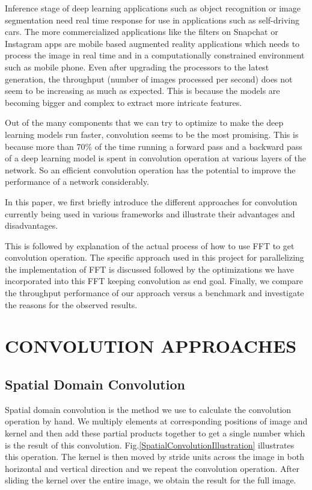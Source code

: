 \documentclass[sigconf]{acmart}
\begin{document}
Inference stage of deep learning applications such as object recognition or image segmentation need real time response for use in applications such as self-driving cars. The more commercialized applications like the filters on Snapchat or Instagram apps are mobile based augmented reality applications which needs to process the image in real time and in a computationally constrained environment such as mobile phone. Even after upgrading the processors to the latest generation, the throughput (number of images processed per second) does not seem to be increasing as much as expected. This is because the models are becoming bigger and complex to extract more intricate features.

Out of the many components that we can try to optimize to make the deep learning models run faster, convolution seems to be the most promising. This is because more than 70\% of the time  running a forward pass and a backward pass of a deep learning model is spent in convolution operation at various layers of the network. So an efficient convolution operation has the potential to improve the performance of a network considerably.

In this paper, we first briefly introduce the different approaches for convolution currently being used in various frameworks and illustrate their advantages and disadvantages.

This is followed by explanation of the actual process of how to use FFT to get convolution operation. The specific approach used in this project for parallelizing the implementation of FFT is discussed followed by the optimizations we have incorporated into this FFT keeping convolution as end goal. Finally, we compare the throughput performance of our approach versus a benchmark and investigate the reasons for the observed results.

\section{CONVOLUTION APPROACHES}
\subsection{Spatial Domain Convolution}

Spatial domain convolution is the method we use to calculate the convolution operation by hand. We multiply elements at corresponding positions of image and kernel and then add these partial products together to get a single number which is the result of this convolution. Fig.\ref{SpatialConvolutionIllustration} illustrates this operation. The kernel is then moved by stride units across the image in both horizontal and vertical direction and we repeat the convolution operation. After sliding the kernel over the entire image, we obtain the result for the full image. 
\end{document}
